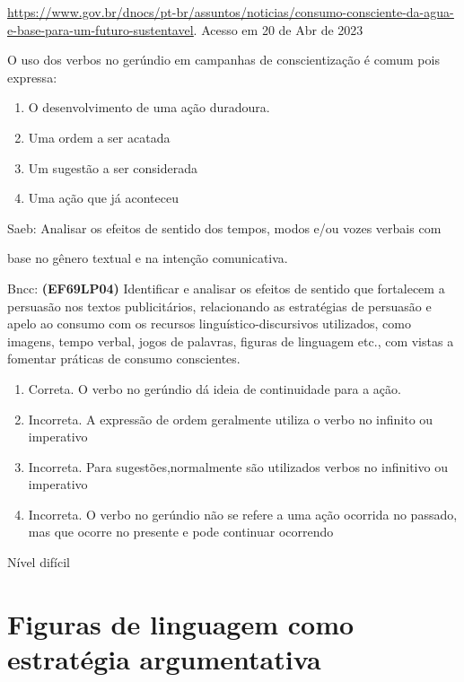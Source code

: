 {{\begin{escolha}
\href{https://www.gov.br/dnocs/pt-br/assuntos/noticias/consumo-consciente-da-agua-e-base-para-um-futuro-sustentavel}{\uline{https://www.gov.br/dnocs/pt-br/assuntos/noticias/consumo-consciente-da-agua-e-base-para-um-futuro-sustentavel}}.
Acesso em 20 de Abr de 2023

O uso dos verbos no gerúndio em campanhas de conscientização é comum
pois expressa:

\begin{enumerate}
\def\labelenumi{\alph{enumi})}
\item
  O desenvolvimento de uma ação duradoura.
\item
  Uma ordem a ser acatada
\item
  Um sugestão a ser considerada
\item
  Uma ação que já aconteceu
\end{enumerate}

Saeb: Analisar os efeitos de sentido dos tempos, modos e/ou vozes
verbais com

base no gênero textual e na intenção comunicativa.

Bncc: \textbf{(EF69LP04)} Identificar e analisar os efeitos de sentido
que fortalecem a persuasão nos textos publicitários, relacionando as
estratégias de persuasão e apelo ao consumo com os recursos
linguístico-discursivos utilizados, como imagens, tempo verbal, jogos de
palavras, figuras de linguagem etc., com vistas a fomentar práticas de
consumo conscientes.

\begin{enumerate}
\def\labelenumi{\arabic{enumi}.}
\item
  Correta. O verbo no gerúndio dá ideia de continuidade para a ação.
\item
  Incorreta. A expressão de ordem geralmente utiliza o verbo no infinito
  ou imperativo
\item
  Incorreta. Para sugestões,normalmente são utilizados verbos no
  infinitivo ou imperativo
\item
  Incorreta. O verbo no gerúndio não se refere a uma ação ocorrida no
  passado, mas que ocorre no presente e pode continuar ocorrendo
\end{enumerate}

Nível difícil


\chapter{Figuras de linguagem como estratégia argumentativa}


\end{escolha}}}
